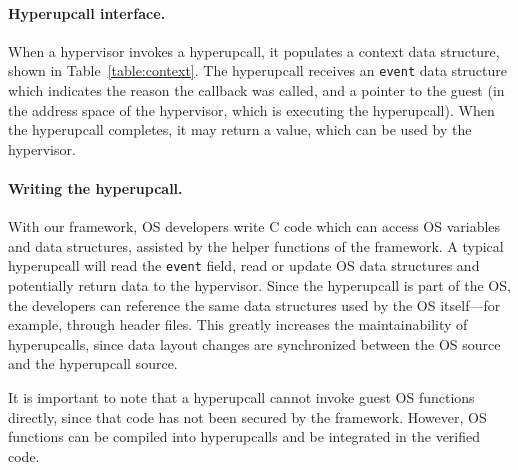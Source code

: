 \documentclass[11pt]{article}
\newcommand{\Hypercallback}{Hyperupcall\xspace{}}
\newcommand{\hypercallback}{hyperupcall\xspace{}}
\begin{document}

\paragraph{\Hypercallback{} interface.} When a hypervisor invokes a \hypercallback,
it populates a context data structure, shown in Table~\ref{table:context}. The
\hypercallback{} receives an \texttt{event} data structure which indicates the reason
the callback was called, and a pointer to the guest (in the address space of the hypervisor,
which is executing the \hypercallback). When the \hypercallback{} completes, it may return a
value, which can be used by the hypervisor.

\paragraph{Writing the \hypercallback.} With our framework, OS developers write C code 
which can access OS variables and data structures, assisted by the helper functions of
the framework. A typical \hypercallback{} will read the \texttt{event} field, read or update
OS data structures and potentially return data to the hypervisor. Since the 
\hypercallback{} is part of the OS, the developers can reference the same data
structures used by the OS itself---for example, through header files. This greatly 
increases the maintainability of \hypercallback{s}, since data layout changes 
are synchronized between the OS source and the \hypercallback{} source. 

It is important to note that a \hypercallback{} cannot invoke guest OS functions 
directly, since that code has not been secured by the framework. However, 
OS functions can be compiled into \hypercallback{}s and be integrated in 
the verified code.
\end{document}
